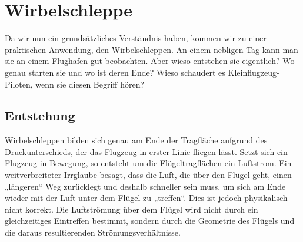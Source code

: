 %
%
%
\section{Wirbelschleppe}
Da wir nun ein grundsätzliches Verständnis haben, kommen wir zu einer praktischen Anwendung, den Wirbelschleppen.
An einem nebligen Tag kann man sie an einem Flughafen gut beobachten. 
Aber wieso entstehen sie eigentlich? 
Wo genau starten sie und wo ist deren Ende?
Wieso schaudert es Kleinflugzeug-Piloten, wenn sie diesen Begriff hören?


\subsection{Entstehung}
Wirbelschleppen bilden sich genau am Ende der Tragfläche aufgrund des Druckunterschieds, der das Flugzeug in erster Linie fliegen lässt.
Setzt sich ein Flugzeug in Bewegung, so entsteht um die Flügeltragflächen ein Luftstrom.
Ein weitverbreiteter Irrglaube besagt, dass die Luft, die über den Flügel geht, einen „längeren“ Weg zurücklegt und deshalb schneller sein muss, um sich am Ende wieder mit der Luft unter dem Flügel zu „treffen“.
Dies ist jedoch physikalisch nicht korrekt.
Die Luftströmung über dem Flügel wird nicht durch ein gleichzeitiges Eintreffen bestimmt, sondern durch die Geometrie des Flügels und die daraus resultierenden Strömungsverhältnisse.

